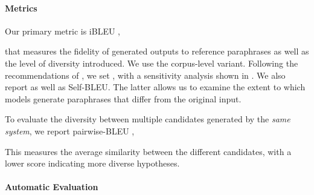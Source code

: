 \documentclass[11pt]{article}
\begin{document}
\paragraph{Metrics}

Our primary metric is iBLEU \cite{ibleu},

that measures the fidelity of generated outputs to reference paraphrases as well as the level of diversity introduced. We use the corpus-level variant. Following the recommendations of \citet{ibleu}, we set , with a sensitivity analysis shown in .  We also report  as well as
\mbox{Self-{BLEU}}. The latter allows us to examine the extent to which models generate paraphrases that differ from the original input.

To evaluate the diversity between multiple candidates generated by the \textit{same system}, we report pairwise-BLEU \cite{cao-wan-2020-divgan},

This measures the average similarity between the different candidates, with a lower score indicating more diverse hypotheses.

\paragraph{Automatic Evaluation}
\end{document}
